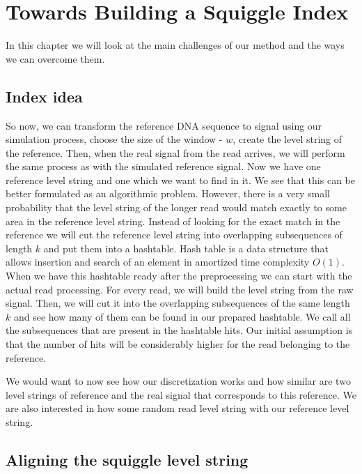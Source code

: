 \chapter{Towards Building a Squiggle Index}

\label{kap:methAdjust} %

In this chapter we will look at the main challenges of our method and the ways
we can overcome them.

\section{Index idea}

So now, we can transform the reference DNA sequence to signal using our simulation
process, choose the size of the window - $w$, create the level string of the reference.
Then, when the real signal from the read arrives, we will perform the same process
as with the simulated reference signal. Now we have one reference level string and
one which we want to find in it. We see that this can be better formulated as an
algorithmic problem. However, there is a very small probability that the level string
of the longer read would match exactly to some area in the reference level string.
Instead of looking for the exact match in the reference we will cut the reference
level string into overlapping subsequences of length $k$ and put them into a hashtable.
Hash table is a data structure that allows insertion and search of an element in
amortized time complexity $O(1)$. When we have this hashtable ready after the
preprocessing we can start with the actual read processing. For every read, we will
build the level string from the raw signal. Then, we will cut it into the overlapping
subsequences of the same length $k$ and see how many of them can be found in our
prepared hashtable. We call all the subsequences that are present in the hashtable
hits. Our initial assumption is that the number of hits will be considerably higher
for the read belonging to the reference.

We would want to now see how our discretization works and how similar are two level
strings of reference and the real signal that corresponds to this reference. We are
also interested in how some random read level string with our reference level string.

\section{Aligning the squiggle level string}

